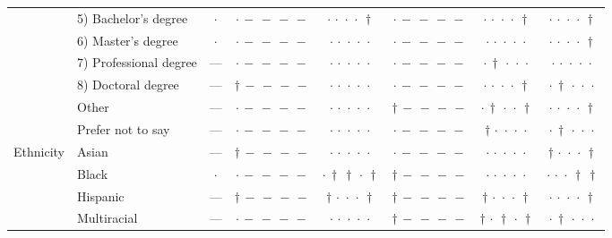 {\begin{longtable}[t]{llcccccc}
 & 5) Bachelor's degree & $\cdot$ & ${\cdot}\,{-}\,{-}\,{-}\,{-}$ & ${\cdot}\,{\cdot}\,{\cdot}\,{\cdot}\,{\dagger}$ & ${\cdot}\,{-}\,{-}\,{-}\,{-}$ & ${\cdot}\,{\cdot}\,{\cdot}\,{\cdot}\,{\dagger}$ & ${\cdot}\,{\cdot}\,{\cdot}\,{\cdot}\,{\dagger}$ \\
 & 6) Master's degree & $\cdot$ & ${\cdot}\,{-}\,{-}\,{-}\,{-}$ & ${\cdot}\,{\cdot}\,{\cdot}\,{\cdot}\,{\cdot}$ & ${\cdot}\,{-}\,{-}\,{-}\,{-}$ & ${\cdot}\,{\cdot}\,{\cdot}\,{\cdot}\,{\cdot}$ & ${\cdot}\,{\cdot}\,{\cdot}\,{\cdot}\,{\dagger}$ \\
 & 7) Professional degree & --- & ${\cdot}\,{-}\,{-}\,{-}\,{-}$ & ${\cdot}\,{\cdot}\,{\cdot}\,{\cdot}\,{\cdot}$ & ${\cdot}\,{-}\,{-}\,{-}\,{-}$ & ${\cdot}\,{\dagger}\,{\cdot}\,{\cdot}\,{\cdot}$ & ${\cdot}\,{\cdot}\,{\cdot}\,{\cdot}\,{\cdot}$ \\
 & 8) Doctoral degree & --- & ${\dagger}\,{-}\,{-}\,{-}\,{-}$ & ${\cdot}\,{\cdot}\,{\cdot}\,{\cdot}\,{\cdot}$ & ${\cdot}\,{-}\,{-}\,{-}\,{-}$ & ${\cdot}\,{\cdot}\,{\cdot}\,{\cdot}\,{\dagger}$ & ${\cdot}\,{\dagger}\,{\cdot}\,{\cdot}\,{\cdot}$ \\
 & Other & --- & ${\cdot}\,{-}\,{-}\,{-}\,{-}$ & ${\cdot}\,{\cdot}\,{\cdot}\,{\cdot}\,{\cdot}$ & ${\dagger}\,{-}\,{-}\,{-}\,{-}$ & ${\cdot}\,{\dagger}\,{\cdot}\,{\cdot}\,{\dagger}$ & ${\cdot}\,{\cdot}\,{\cdot}\,{\cdot}\,{\dagger}$ \\
 & Prefer not to say & --- & ${\cdot}\,{-}\,{-}\,{-}\,{-}$ & ${\cdot}\,{\cdot}\,{\cdot}\,{\cdot}\,{\cdot}$ & ${\cdot}\,{-}\,{-}\,{-}\,{-}$ & ${\dagger}\,{\cdot}\,{\cdot}\,{\cdot}\,{\cdot}$ & ${\cdot}\,{\dagger}\,{\cdot}\,{\cdot}\,{\cdot}$ \\
\cline{1-8}
\multirow[t]{7}{*}{Ethnicity} & Asian & --- & ${\dagger}\,{-}\,{-}\,{-}\,{-}$ & ${\cdot}\,{\cdot}\,{\cdot}\,{\cdot}\,{\cdot}$ & ${\cdot}\,{-}\,{-}\,{-}\,{-}$ & ${\cdot}\,{\cdot}\,{\cdot}\,{\cdot}\,{\cdot}$ & ${\dagger}\,{\cdot}\,{\cdot}\,{\cdot}\,{\dagger}$ \\
 & Black & $\cdot$ & ${\cdot}\,{-}\,{-}\,{-}\,{-}$ & ${\cdot}\,{\dagger}\,{\dagger}\,{\cdot}\,{\dagger}$ & ${\dagger}\,{-}\,{-}\,{-}\,{-}$ & ${\cdot}\,{\cdot}\,{\cdot}\,{\cdot}\,{\cdot}$ & ${\cdot}\,{\cdot}\,{\cdot}\,{\dagger}\,{\dagger}$ \\
 & Hispanic & --- & ${\dagger}\,{-}\,{-}\,{-}\,{-}$ & ${\dagger}\,{\cdot}\,{\cdot}\,{\cdot}\,{\dagger}$ & ${\dagger}\,{-}\,{-}\,{-}\,{-}$ & ${\dagger}\,{\cdot}\,{\cdot}\,{\cdot}\,{\dagger}$ & ${\cdot}\,{\cdot}\,{\cdot}\,{\cdot}\,{\dagger}$ \\
 & Multiracial & --- & ${\cdot}\,{-}\,{-}\,{-}\,{-}$ & ${\cdot}\,{\cdot}\,{\cdot}\,{\cdot}\,{\cdot}$ & ${\dagger}\,{-}\,{-}\,{-}\,{-}$ & ${\dagger}\,{\cdot}\,{\dagger}\,{\cdot}\,{\dagger}$ & ${\cdot}\,{\dagger}\,{\cdot}\,{\cdot}\,{\cdot}$ \\

\end{longtable}}
